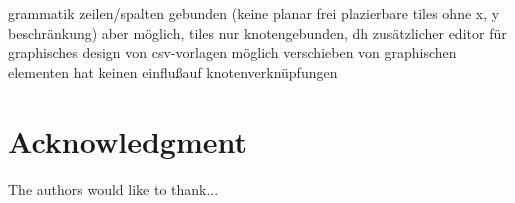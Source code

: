 \documentclass[conference]{IEEEtran}
\begin{document}
grammatik zeilen/spalten gebunden (keine planar frei plazierbare tiles ohne x, y beschr\"ankung)
aber m\"oglich, tiles nur knotengebunden, dh
zus\"atzlicher editor f\"ur graphisches design von csv-vorlagen m\"oglich
verschieben von graphischen elementen hat keinen einflu\ss  auf knotenverkn\"upfungen



\section*{Acknowledgment}


The authors would like to thank...






\end{document}
